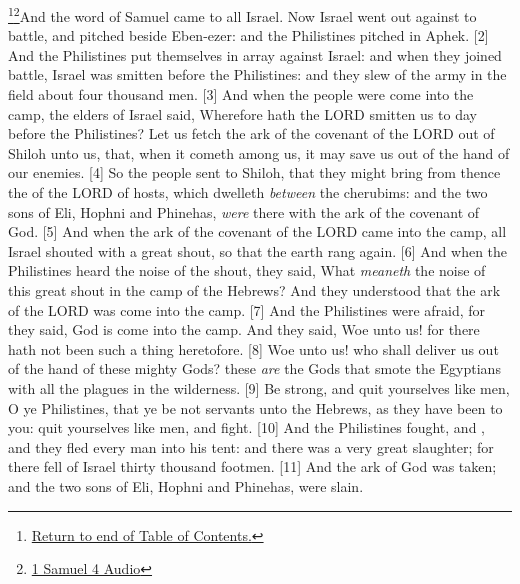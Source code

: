 \footnote{\textcolor[cmyk]{0.99998,1,0,0}{\hyperlink{TOC}{Return to end of Table of Contents.}}}\footnote{\href{https://audiobible.com/bible/1_samuel_4.html}{\textcolor[cmyk]{0.99998,1,0,0}{1 Samuel 4 Audio}}}\textcolor[cmyk]{0.99998,1,0,0}{And the word of Samuel came to all Israel. Now Israel went out against  to battle, and pitched beside Eben-ezer: and the Philistines pitched in Aphek.}
[2] \textcolor[cmyk]{0.99998,1,0,0}{And the Philistines put themselves in array against Israel: and when they joined battle, Israel was smitten before the Philistines: and they slew of the army in the field about four thousand men.}
[3] \textcolor[cmyk]{0.99998,1,0,0}{And when the people were come into the camp, the elders of Israel said, Wherefore hath the LORD smitten us to day before the Philistines? Let us fetch the ark of the covenant of the LORD out of Shiloh unto us, that, when it cometh among us, it may save us out of the hand of our enemies.}
[4] \textcolor[cmyk]{0.99998,1,0,0}{So the people sent to Shiloh, that they might bring from thence the  of the LORD of hosts, which dwelleth \emph{between} the cherubims: and the two sons of Eli, Hophni and Phinehas, \emph{were} there with the ark of the covenant of God.}
[5] \textcolor[cmyk]{0.99998,1,0,0}{And when the ark of the covenant of the LORD came into the camp, all Israel shouted with a great shout, so that the earth rang again.}
[6] \textcolor[cmyk]{0.99998,1,0,0}{And when the Philistines heard the noise of the shout, they said, What \emph{meaneth} the noise of this great shout in the camp of the Hebrews? And they understood that the ark of the LORD was come into the camp.}
[7] \textcolor[cmyk]{0.99998,1,0,0}{And the Philistines were afraid, for they said, God is come into the camp. And they said, Woe unto us! for there hath not been such a thing heretofore.}
[8] \textcolor[cmyk]{0.99998,1,0,0}{Woe unto us! who shall deliver us out of the hand of these mighty Gods? these \emph{are} the Gods that smote the Egyptians with all the plagues in the wilderness.}
[9] \textcolor[cmyk]{0.99998,1,0,0}{Be strong, and quit yourselves like men, O ye Philistines, that ye be not servants unto the Hebrews, as they have been to you: quit yourselves like men, and fight.}
[10] \textcolor[cmyk]{0.99998,1,0,0}{And the Philistines fought, and , and they fled every man into his tent: and there was a very great slaughter; for there fell of Israel thirty thousand footmen.}
[11] \textcolor[cmyk]{0.99998,1,0,0}{And the ark of God was taken; and the two sons of Eli, Hophni and Phinehas, were slain.}
